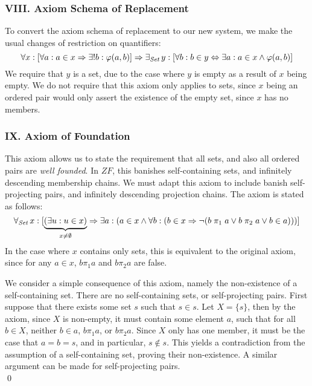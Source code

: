 \documentclass[11pt]{report}
\newcommand{\all}[1]{\forall_{\mathit{#1}}\hspace{0.5mm}}
\newcommand{\ex}[1]{\exists_{\mathit{#1}}\hspace{0.5mm}}
\newcommand{\pleft}{\mathrel{\pi_1}}
\newcommand{\pright}{\mathrel{\pi_2}}
\theoremstyle{definition}
\theoremstyle{theorem}
\theoremstyle{lemma}
\begin{document}
\subsubsection*{VIII. Axiom Schema of Replacement}
To convert the axiom schema of replacement to our new system, we make the usual changes of restriction on quantifiers:
$$\forall x: [\forall a: a\in x \Rightarrow \exists!b: \varphi(a,b)]
  \Rightarrow \ex{Set} y:[\forall b: b\in y \Leftrightarrow
                                     \exists a: a\in x \wedge\varphi(a,b)]$$
We require that $y$ is a set, due to the case where $y$ is empty as a result of $x$ being empty.
We do not require that this axiom only applies to sets, since $x$ being an ordered pair would only assert the existence of the empty set, since $x$ has no members.

\subsubsection*{IX. Axiom of Foundation}
This axiom allows us to state the requirement that all sets, and also all ordered pairs are \emph{well founded}.
In $ZF$, this banishes self-containing sets, and infinitely descending membership chains.
We must adapt this axiom to include banish self-projecting pairs, and infinitely descending projection chains.
The axiom is stated as follows:
$$\all{Set} x: [\underbrace{(\exists u: u\in x)}_{x \neq \emptyset}
  \Rightarrow \exists a: (a\in x \wedge
               \forall b: (b\in x
               \Rightarrow \neg(b\pleft a \vee b\pright a \vee b\in a)))]
$$
In the case where $x$ contains only sets, this is equivalent to the original axiom, since for any $a\in x$, $b\pleft a$ and $b\pright a$ are false.

We consider a simple consequence of this axiom, namely the non-existence of a self-containing set.
\theorem There are no self-containing sets, or self-projecting pairs.
\proof First suppose that there exists some set $s$ such that $s\in s$.
Let $X = \{s\}$, then by the axiom, since $X$ is non-empty, it must contain some element $a$, such that for all $b\in X$, neither $b\in a$, $b\pleft a$, or $b\pright a$.
Since $X$ only has one member, it must be the case that $a=b=s$, and in particular, $s\notin s$.
This yields a contradiction from the assumption of a self-containing set, proving their non-existence.
A similar argument can be made for self-projecting pairs.\\
\qed \\
\end{document}
